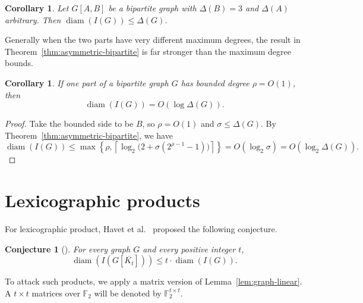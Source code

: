 \documentclass[11pt]{article}
\newtheorem{conjecture}[theorem]{Conjecture}
\newtheorem{corollary}[theorem]{Corollary}
\theoremstyle{remark}
\DeclareMathOperator{\diam}{diam}
\newcommand{\F}{\mathbb{F}}
\begin{document}
\begin{corollary}\label{cor:one-side-three}
Let $G[A,B]$ be a bipartite graph with $\Delta(B)=3$ and $\Delta(A)$ arbitrary.
Then $\diam(I(G))\le\Delta(G)$.
\end{corollary}

Generally when the two parts have very different maximum degrees, the result in Theorem~\ref{thm:asymmetric-bipartite} is far stronger than the maximum degree bounds.  

\begin{corollary}\label{cor:exp-smaller}
If one part of a bipartite graph $G$ has bounded degree $\rho=O(1)$, then
\[
  \diam(I(G))=O(\log\Delta(G)).
\]
\end{corollary}

\begin{proof}
Take the bounded side to be $B$, so $\rho=O(1)$ and $\sigma\le\Delta(G)$.
By Theorem~\ref{thm:asymmetric-bipartite}, we have 
\[
  \diam(I(G))\le
  \max\left\{\rho,
  \left\lceil\log_2\bigl(2+\sigma(2^{\rho-1}-1)\bigr)\right\rceil\right\}
  =O(\log_2\sigma)=O(\log_2\Delta(G)).
\]\end{proof}



\section{Lexicographic products}\label{sec:lex-products}

For lexicographic product,  
Havet et al.~\cite{HavetHorschRambaud} proposed the following conjecture.

\begin{conjecture}[{\cite{HavetHorschRambaud}}]\label{conj:lex-product}
For every graph $G$ and every positive integer $t$,
\[
  \diam(I(G[\overline{K_t}]))\le t\cdot\diam(I(G)).
\]
\end{conjecture}

To attack such products, we apply a matrix version of Lemma~\ref{lem:graph-linear}.   A $t\times t$ matrices over $\F_2$ will be denoted by $\F_2^{t\times t}$.
\end{document}
